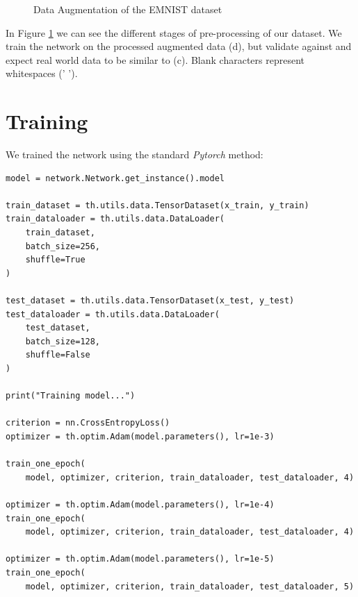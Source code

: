 \documentclass[12pt, a4paper]{report}
\begin{document}
\begin{figure}[!h]
\begin{center}
		\hspace{1cm}
	\end{center}
	\caption{Data Augmentation of the EMNIST dataset}
	\label{emnist-transformation}
\end{figure}

In Figure \ref{emnist-transformation} we can see the different stages of pre-processing of our dataset. We train the network on the processed augmented data (d), but validate against and expect real world data to be similar to (c). Blank characters represent whitespaces (' ').

\section{Training}

We trained the network using the standard \textit{Pytorch} method:
\begin{verbatim}
model = network.Network.get_instance().model

train_dataset = th.utils.data.TensorDataset(x_train, y_train)
train_dataloader = th.utils.data.DataLoader(
    train_dataset,
    batch_size=256,
    shuffle=True
)

test_dataset = th.utils.data.TensorDataset(x_test, y_test)
test_dataloader = th.utils.data.DataLoader(
    test_dataset,
    batch_size=128,
    shuffle=False
)

print("Training model...")

criterion = nn.CrossEntropyLoss()
optimizer = th.optim.Adam(model.parameters(), lr=1e-3)

train_one_epoch(
    model, optimizer, criterion, train_dataloader, test_dataloader, 4)

optimizer = th.optim.Adam(model.parameters(), lr=1e-4)
train_one_epoch(
    model, optimizer, criterion, train_dataloader, test_dataloader, 4)

optimizer = th.optim.Adam(model.parameters(), lr=1e-5)
train_one_epoch(
    model, optimizer, criterion, train_dataloader, test_dataloader, 5)	
\end{verbatim}
\end{document}
